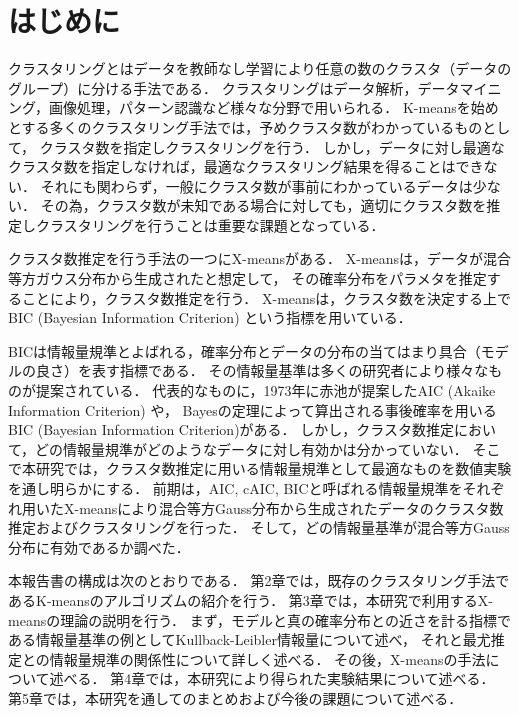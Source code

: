 \section{はじめに}
クラスタリングとはデータを教師なし学習により任意の数のクラスタ（データのグループ）に分ける手法である．
クラスタリングはデータ解析，データマイニング，画像処理，パターン認識など様々な分野で用いられる．
K-meansを始めとする多くのクラスタリング手法では，予めクラスタ数がわかっているものとして，
クラスタ数を指定しクラスタリングを行う．
しかし，データに対し最適なクラスタ数を指定しなければ，最適なクラスタリング結果を得ることはできない．
それにも関わらず，一般にクラスタ数が事前にわかっているデータは少ない．
その為，クラスタ数が未知である場合に対しても，適切にクラスタ数を推定しクラスタリングを行うことは重要な課題となっている．

クラスタ数推定を行う手法の一つにX-meansがある．
X-meansは，データが混合等方ガウス分布から生成されたと想定して，
その確率分布をパラメタを推定することにより，クラスタ数推定を行う．
X-meansは，クラスタ数を決定する上でBIC (Bayesian Information Criterion) という指標を用いている．

BICは情報量規準とよばれる，確率分布とデータの分布の当てはまり具合（モデルの良さ）を表す指標である．
その情報量基準は多くの研究者により様々なものが提案されている．
代表的なものに，1973年に赤池が提案したAIC (Akaike Information Criterion) や，
Bayesの定理によって算出される事後確率を用いるBIC (Bayesian Information Criterion)がある．
しかし，クラスタ数推定において，どの情報量規準がどのようなデータに対し有効かは分かっていない．
そこで本研究では，クラスタ数推定に用いる情報量規準として最適なものを数値実験を通し明らかにする．
前期は，AIC, cAIC, BICと呼ばれる情報量規準をそれぞれ用いたX-meansにより混合等方Gauss分布から生成されたデータのクラスタ数推定およびクラスタリングを行った．
そして，どの情報量基準が混合等方Gauss分布に有効であるか調べた．

本報告書の構成は次のとおりである．
第2章では，既存のクラスタリング手法であるK-meansのアルゴリズムの紹介を行う．
第3章では，本研究で利用するX-meansの理論の説明を行う．
まず，モデルと真の確率分布との近さを計る指標である情報量基準の例としてKullback-Leibler情報量について述べ，
それと最尤推定との情報量規準の関係性について詳しく述べる．
その後，X-meansの手法について述べる．
第4章では，本研究により得られた実験結果について述べる．
第5章では，本研究を通してのまとめおよび今後の課題について述べる．
